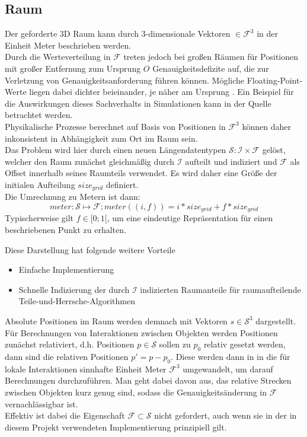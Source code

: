\subsection{Raum}
\label{sec:space}
Der geforderte 3D Raum kann durch 3-dimensionale Vektoren $\in \mathcal{F}^3$ in der Einheit Meter beschrieben werden.\\
Durch die Werteverteilung in $\mathcal{F}$ treten jedoch bei großen Räumen für Positionen mit großer Entfernung zum Ursprung $O$ Genauigkeitsdefizite auf, die zur Verletzung von Genauigkeitsanforderung führen können. Mögliche Floating-Point-Werte liegen dabei dichter beieinander, je näher am Ursprung \cite{floatdistribution}. Ein Beispiel für die Auswirkungen dieses Sachverhalts in Simulationen kann in der Quelle \cite{floatdistributionexample} betrachtet werden.\\
Physikalische Prozesse berechnet auf Basis von Positionen in $\mathcal{F}^3$ können daher inkonsistent in Abhängigkeit zum Ort im Raum sein.\\
Das Problem wird hier durch einen neuen Längendatentypen $\mathcal{S} : \mathcal{I} \times \mathcal{F}$ gelöst, welcher den Raum zunächst gleichmäßig durch $\mathcal{I}$ aufteilt und indiziert und $\mathcal{F}$ als Offset innerhalb seines Raumteils verwendet. Es wird daher eine Größe der initialen Aufteilung $size_{grid}$ definiert.\\
Die Umrechnung zu Metern ist dann: $$ meter: \mathcal{S} \mapsto \mathcal{F};  meter((i, f)) = i * size_{grid} + f * size_{grid}$$ 
Typischerweise gilt $f \in [0;1[$, um eine eindeutige Repräsentation für einen beschriebenen Punkt zu erhalten.

Diese Darstellung hat folgende weitere Vorteile
\begin{itemize}
\item Einfache Implementierung
\item Schnelle Indizierung der durch $\mathcal{I}$ indizierten Raumanteile für raumaufteilende Teile-und-Herrsche-Algorithmen
\end{itemize}

Absolute Positionen im Raum werden demnach mit Vektoren $s\in\mathcal{S}^3$ dargestellt. Für Berechnungen von Interaktionen zwischen Objekten werden Positionen zunächst relativiert, d.h. Positionen $p \in \mathcal{S}$ sollen zu $p_0$ relativ gesetzt werden, dann sind die relativen Positionen $p' = p - p_0$. Diese werden dann in in die für lokale Interaktionen sinnhafte  Einheit Meter $\mathcal{F}^3$ umgewandelt, um darauf Berechnungen durchzuführen. Man geht dabei davon aus, das relative Strecken zwischen Objekten kurz genug sind, sodass die Genauigkeitsänderung in $\mathcal{F}$ vernachlässigbar ist.\\
Effektiv ist dabei die Eigenschaft $\mathcal{F}\subset\mathcal{S}$ nicht gefordert, auch wenn sie in der in diesem Projekt verwendeten Implementierung prinzipiell gilt.

